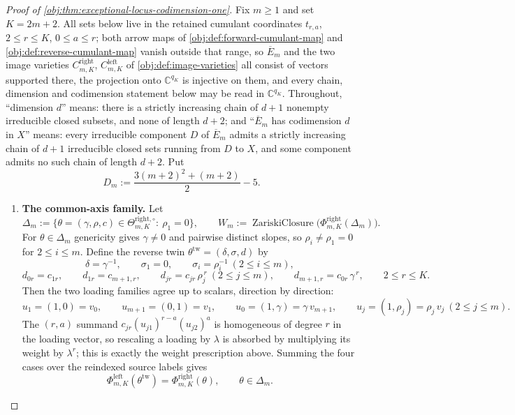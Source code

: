 \documentclass[11pt]{article}
\begin{document}
\begin{proof}[Proof of \cref{obj:thm:exceptional-locus-codimension-one}]
Fix \(m\ge 1\) and set \(K=2m+2\).  All sets below live in the retained cumulant coordinates \(t_{r,a}\), \(2\le r\le K\), \(0\le a\le r\); both arrow maps of \cref{obj:def:forward-cumulant-map} and \cref{obj:def:reverse-cumulant-map} vanish outside that range, so \(\overline E_m\) and the two image varieties \(C^{\mathrm{right}}_{m,K}\), \(C^{\mathrm{left}}_{m,K}\) of \cref{obj:def:image-varieties} all consist of vectors supported there, the projection onto \(\mathbb C^{q_K}\) is injective on them, and every chain, dimension and codimension statement below may be read in \(\mathbb C^{q_K}\).  Throughout, ``dimension \(d\)'' means: there is a strictly increasing chain of \(d+1\) nonempty irreducible closed subsets, and none of length \(d+2\); and ``\(\overline E_m\) has codimension \(d\) in \(X\)'' means: every irreducible component \(D\) of \(\overline E_m\) admits a strictly increasing chain of \(d+1\) irreducible closed sets running from \(D\) to \(X\), and some component admits no such chain of length \(d+2\).  Put
\[
D_m:=\frac{3(m+2)^2+(m+2)}{2}-5 .
\]

\begin{enumerate}
\item \textbf{The common-axis family.}  Let
\[
\Delta_m:=\bigl\{\theta=(\gamma,\rho,c)\in\Theta^{\mathrm{right},\circ}_{m,K}:\ \rho_1=0\bigr\},
\qquad
W_m:=\operatorname{ZariskiClosure}\bigl(\Phi^{\mathrm{right}}_{m,K}(\Delta_m)\bigr).
\]
For \(\theta\in\Delta_m\) genericity gives \(\gamma\ne0\) and pairwise distinct slopes, so \(\rho_i\ne\rho_1=0\) for \(2\le i\le m\).  Define the reverse twin \(\theta^{\mathrm{tw}}=(\delta,\sigma,d)\) by
\[
\delta=\gamma^{-1},\qquad
\sigma_1=0,\qquad
\sigma_i=\rho_i^{-1}\ (2\le i\le m),
\]
\[
d_{0r}=c_{1r},\qquad
d_{1r}=c_{m+1,r},\qquad
d_{jr}=c_{jr}\,\rho_j^{\,r}\ (2\le j\le m),\qquad
d_{m+1,r}=c_{0r}\,\gamma^{\,r},
\qquad 2\le r\le K .
\]
Then the two loading families agree up to scalars, direction by direction:
\[
u_1=(1,0)=v_0,\qquad
u_{m+1}=(0,1)=v_1,\qquad
u_0=(1,\gamma)=\gamma\,v_{m+1},\qquad
u_j=(1,\rho_j)=\rho_j\,v_j\ (2\le j\le m).
\]
The \((r,a)\) summand \(c_{jr}(u_{j1})^{r-a}(u_{j2})^{a}\) is homogeneous of degree \(r\) in the loading vector, so rescaling a loading by \(\lambda\) is absorbed by multiplying its weight by \(\lambda^{r}\); this is exactly the weight prescription above.  Summing the four cases over the reindexed source labels gives
\[
\Phi^{\mathrm{left}}_{m,K}(\theta^{\mathrm{tw}})=\Phi^{\mathrm{right}}_{m,K}(\theta),
\qquad \theta\in\Delta_m .
\]


\end{enumerate}
\end{proof}
\end{document}
